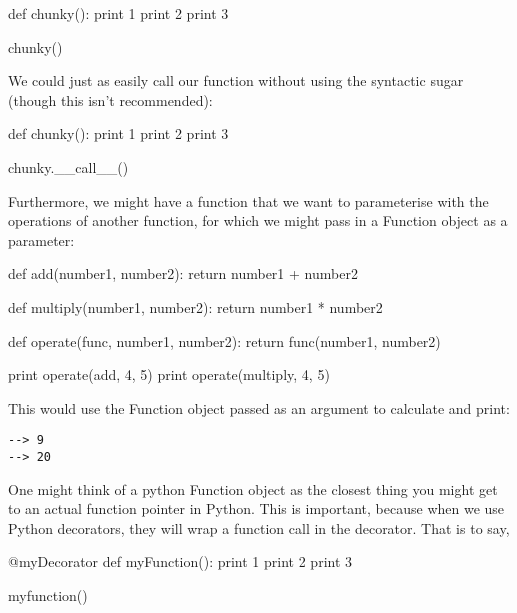 \begin{pyglist}[language = python, encoding = utf8, caption = {A basic Python example}, listingname=\textbf{Code Sample}, numbers=left]
def chunky():
  print 1
  print 2
  print 3
  
chunky()
\end{pyglist} \par

We could just as easily call our function without using the syntactic sugar (though this isn't recommended): \par

\begin{pyglist}[language = python, encoding = utf8, caption = {Demonstrating Python's \_\_call\_\_() syntactic sugar}, listingname=\textbf{Code Sample}, numbers=left]
def chunky():
  print 1
  print 2
  print 3
  
chunky.__call__()
\end{pyglist} \par

Furthermore, we might have a function that we want to parameterise with the operations of another function, for which we might pass in a Function object as a parameter: 

\begin{pyglist}[language = python, encoding = utf8, caption = {Python function objects can be passed and run, like a function pointer}, listingname=\textbf{Code Sample}, numbers=left]
def add(number1, number2):
  return number1 + number2
  
def multiply(number1, number2):
  return number1 * number2
  
def operate(func, number1, number2):
  return func(number1, number2)

print operate(add, 4, 5)
print operate(multiply, 4, 5)
\end{pyglist} \par

This would use the Function object passed as an argument to calculate and print: \par

\begin{verbatim}
--> 9
--> 20    
\end{verbatim}\par

One might think of a python Function object as the closest thing you might get to an actual function pointer in Python. This is important, because when we use Python decorators, they will wrap a function call in the decorator. That is to say, 
\begin{pyglist}[language = python, encoding = utf8, caption = {A basic decorator example}, listingname=\textbf{Code Sample}, numbers=left]
@myDecorator
def myFunction():
  print 1
  print 2
  print 3
  
myfunction()
\end{pyglist} \par

